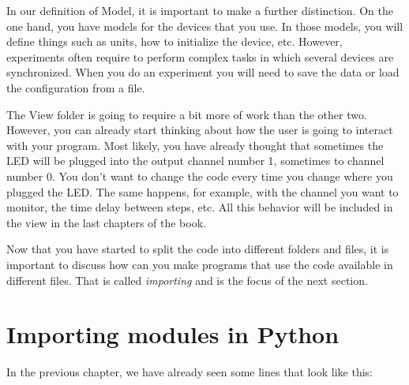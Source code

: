 
In our definition of Model, it is important to make a further distinction. On the one hand, you have models for the devices that you use. In those models, you will define things such as units, how to initialize the device, etc. However, experiments often require to perform complex tasks in which several devices are synchronized. When you do an experiment you will need to save the data or load the configuration from a file. 


The View folder is going to require a bit more of work than the other two. However, you can already start thinking about how the user is going
to interact with your program. Most likely, you have already thought that sometimes the {LED} will be plugged into the output channel number 1,
sometimes to channel number 0. You don't want to change the code every time you change where you plugged the LED. The same happens, for example, with the channel you want to monitor, the time delay between steps, etc. All this behavior will be included in the view in the last chapters of the book. 

Now that you have started to split the code into different folders and files, it is important to discuss how can you make programs that use the code available in different files. That is called \emph{importing} and is the focus of the next section. 

\section{Importing modules in Python}\label{section:importing-python}
In the previous chapter, we have already seen some lines that look like this:

